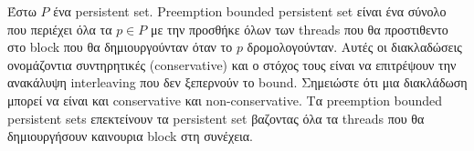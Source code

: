 
Έστω $P$ ένα persistent set. Preemption bounded persistent set είναι ένα σύνολο που περιέχει όλα τα $p \in P$ με την προσθήκε όλων των
threads που θα προστιθεντο στο block που θα δημιουργούνταν όταν το $p$ δρομολογούνταν. Αυτές οι διακλαδώσεις ονομάζοντια συντηρητικές (conservative) και ο στόχος τους είναι 
να επιτρέψουν την ανακάλυψη interleaving που δεν ξεπερνούν το bound. Σημειώστε ότι μια διακλάδωση μπορεί να είναι και conservative και non-conservative.
Τα preemption bounded persistent sets επεκτείνουν τα persistent set βαζοντας όλα τα threads που θα δημιουργήσουν καινουρια block στη συνέχεια.

